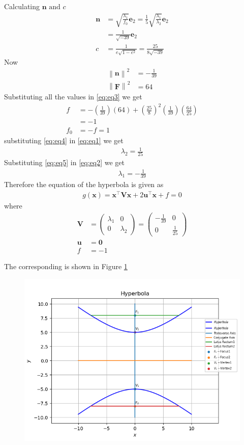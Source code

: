 \documentclass[12pt]{article}
\providecommand{\brak}[1]{\ensuremath{\left(#1\right)}}
\providecommand{\norm}[1]{\left\lVert#1\right\rVert}
\newcommand{\myvec}[1]{\ensuremath{\begin{pmatrix}#1\end{pmatrix}}}
\let\vec\mathbf
\begin{document}
\begin{enumerate}
Calculating $\vec{n} \text{ and } c$
\begin{align}
	\vec{n} &= \sqrt{\frac{\lambda_1}{f_0}}\vec{e}_2 = \frac{1}{5}\sqrt{\frac{\lambda_1}{\lambda_2}}\vec{e}_2\\
	        &= \frac{1}{\sqrt{-39}}\vec{e}_2\\
	c &= \frac{1}{e\sqrt{1-e^2}} = \frac{25}{8\sqrt{-39}}	
\end{align}
Now
\begin{align}
	\norm{\vec{n}}^2 &= -\frac{1}{39}\\
	\norm{\vec{F}}^2 &= 64
\end{align}
Substituting all the values in \eqref{eq:eq3} we get
\begin{align}
	f &= -\brak{\frac{1}{39}}\brak{64} + \brak{\frac{25}{8}}^2 \brak{\frac{1}{39}} \brak{\frac{64}{25}}\\
	  &= -1\\
	\label{eq:eq4}  
	f_0  &= -f = 1
\end{align}
substituting \eqref{eq:eq4} in \eqref{eq:eq1} we get
\begin{align}
	\label{eq:eq5}
	\lambda_2 = \frac{1}{25} 
\end{align}
Substituting \eqref{eq:eq5} in \eqref{eq:eq2} we get
\begin{align}
	\lambda_1 = -\frac{1}{39}
\end{align}
Therefore the equation of the hyperbola is given as
\begin{align}
	g\brak{\vec{x}}=\vec{x}^\top \vec{V} \vec{x} + 2\vec{u}^\top \vec{x} + f = 0
\end{align}
where
\begin{align}
	\vec{V} &= \myvec{\lambda_1&0\\0&\lambda_2} = \myvec{-\frac{1}{39}&0\\0&\frac{1}{25}}\\
	\vec{u} &= \vec{0}\\
	f &= -1
\end{align}
\end{enumerate}
The corresponding is shown in Figure \ref{fig:Fig1}
\begin{figure}[!h]
	\begin{center} 
	    \includegraphics[width=\columnwidth]{figs/hyperbola2}
	\end{center}
\caption{}
\label{fig:Fig1}
\end{figure}
\end{document}
